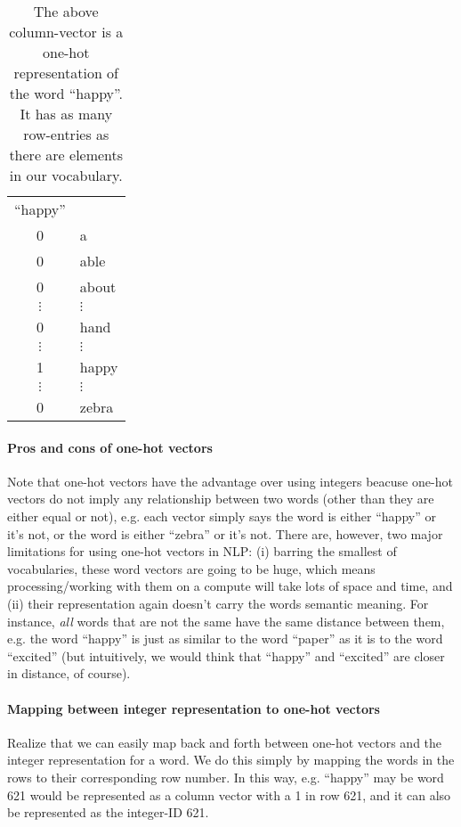 \documentclass[12pt]{article}
\begin{document}
\begin{table}[h]
  \begin{center}
    \begin{tabular}{c l}
      ``happy'' & \\
      0 & a \\
      0 & able \\
      0 & about \\
      $\vdots$ & $\vdots$ \\
      0 & hand \\
      $\vdots$ & $\vdots$ \\      
      1 & happy \\
      $\vdots$ & $\vdots$ \\
      0 & zebra \\
    \end{tabular}
    \caption{The above column-vector is a one-hot representation of the word ``happy''. It has as many row-entries as there are elements in our vocabulary.}
  \end{center}
\end{table}

\paragraph{Pros and cons of one-hot vectors}
Note that one-hot vectors have the advantage over using integers beacuse one-hot vectors do not imply any relationship between two words (other than they are either equal or not), e.g. each vector simply says the word is either ``happy'' or it's not, or the word is either ``zebra'' or it's not. There are, however, two major limitations for using one-hot vectors in NLP: (i) barring the smallest of vocabularies, these word vectors are going to be huge, which means processing/working with them on a compute will take lots of space and time, and (ii) their representation again doesn't carry the words semantic meaning. For instance, \emph{all} words that are not the same have the same distance between them, e.g. the word ``happy'' is just as similar to the word ``paper'' as it is to the word ``excited'' (but intuitively, we would think that ``happy'' and ``excited'' are closer in distance, of course).

\paragraph{Mapping between integer representation to one-hot vectors} Realize that we can easily map back and forth between one-hot vectors and the integer representation for a word. We do this simply by mapping the words in the rows to their corresponding row number. In this way, e.g. ``happy'' may be word 621 would be represented as a column vector with a 1 in row 621, and it can also be represented as the integer-ID 621.
\end{document}
